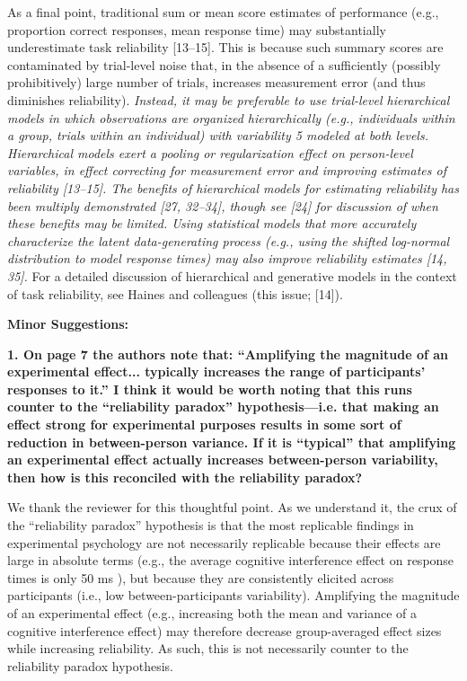 \documentclass[a4paper,12pt]{article}
\begin{document}
\begin{displayquote}
    As a final point, traditional sum or mean score estimates of performance (e.g., proportion correct responses, mean response time) may substantially underestimate task reliability [13–15]. This is because such summary scores are contaminated by trial-level noise that, in the absence of a sufficiently (possibly prohibitively) large number of trials, increases measurement error (and thus diminishes reliability). \textit{Instead, it may be preferable to use trial-level hierarchical models in which observations are organized hierarchically (e.g., individuals within a group, trials within an individual) with variability 5 modeled at both levels. Hierarchical models exert a pooling or regularization effect on person-level variables, in effect correcting for measurement error and improving estimates of reliability [13–15]. The benefits of hierarchical models for estimating reliability has been multiply demonstrated [27, 32–34], though see [24] for discussion of when these benefits may be limited. Using statistical models that more accurately characterize the latent data-generating process (e.g., using the shifted log-normal distribution to model response times) may also improve reliability estimates [14, 35].} For a detailed discussion of hierarchical and generative models in the context of task reliability, see Haines and colleagues (this issue; [14]).
\end{displayquote}

\textbf{Minor Suggestions:}

\textbf{1. On page 7 the authors note that: ``Amplifying the magnitude of an experimental effect... typically increases the range of participants’ responses to it.'' I think it would be worth noting that this runs counter to the ``reliability paradox'' hypothesis—i.e. that making an effect strong for experimental purposes results in some sort of reduction in between-person variance. If it is ``typical'' that amplifying an experimental effect actually increases between-person variability, then how is this reconciled with the reliability paradox?}

We thank the reviewer for this thoughtful point. As we understand it, the crux of the ``reliability paradox'' hypothesis is that the most replicable findings in experimental psychology are not necessarily replicable because their effects are large in absolute terms (e.g., the average cognitive interference effect on response times is only 50 ms \cite{rouder2019most}), but because they are consistently elicited across participants (i.e., low between-participants variability). Amplifying the magnitude of an experimental effect (e.g., increasing both the mean and variance of a cognitive interference effect) may therefore decrease group-averaged effect sizes while increasing reliability. As such, this is not necessarily counter to the reliability paradox hypothesis. 
\end{document}

